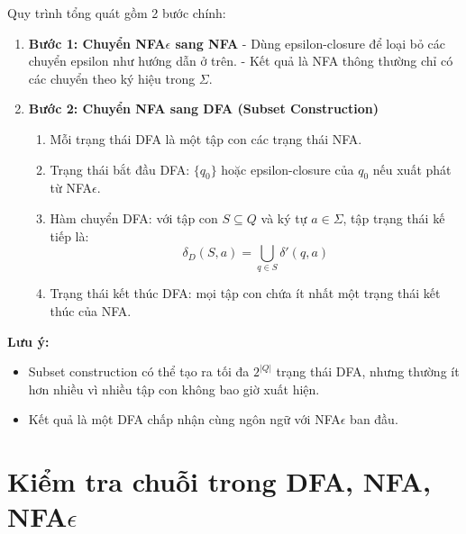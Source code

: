 \documentclass[12pt,a4paper]{report}
\begin{document}
Quy trình tổng quát gồm 2 bước chính:

\begin{enumerate}
    \item \textbf{Bước 1: Chuyển NFA$\epsilon$ sang NFA}  
    - Dùng epsilon-closure để loại bỏ các chuyển epsilon như hướng dẫn ở trên.  
    - Kết quả là NFA thông thường chỉ có các chuyển theo ký hiệu trong $\Sigma$.
    
    \item \textbf{Bước 2: Chuyển NFA sang DFA (Subset Construction)}  
    \begin{enumerate}
        \item Mỗi trạng thái DFA là một tập con các trạng thái NFA.
        \item Trạng thái bắt đầu DFA: $\{ q_0 \}$ hoặc epsilon-closure của $q_0$ nếu xuất phát từ NFA$\epsilon$.  
        \item Hàm chuyển DFA: với tập con $S \subseteq Q$ và ký tự $a \in \Sigma$, tập trạng thái kế tiếp là:
        \[
            \delta_D(S, a) = \bigcup_{q \in S} \delta'(q, a)
        \]
        \item Trạng thái kết thúc DFA: mọi tập con chứa ít nhất một trạng thái kết thúc của NFA.
    \end{enumerate}
\end{enumerate}

\textbf{Lưu ý:}
\begin{itemize}
    \item Subset construction có thể tạo ra tối đa $2^{|Q|}$ trạng thái DFA, nhưng thường ít hơn nhiều vì nhiều tập con không bao giờ xuất hiện.  
    \item Kết quả là một DFA chấp nhận cùng ngôn ngữ với NFA$\epsilon$ ban đầu.
\end{itemize}


\section{Kiểm tra chuỗi trong DFA, NFA, NFA$\epsilon$}
\end{document}
